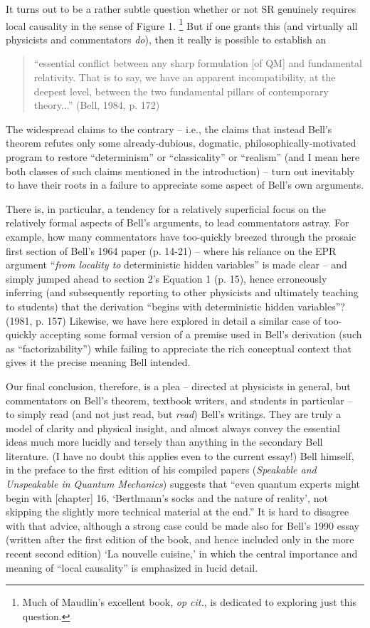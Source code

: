 \documentclass[aps,prc,twocolumn]{revtex4}
\begin{document}
It turns out to be a rather subtle question whether or not SR
genuinely requires local causality in the sense of Figure 1.  
\footnote{Much of Maudlin's excellent book, \emph{op cit.}, is
  dedicated to exploring just this question.}
But if one grants this (and virtually all physicists and commentators
\emph{do}), then it really is possible to establish an 
\begin{quote}
``essential
conflict between any sharp formulation [of QM] and fundamental
relativity.  That is to say, we have an apparent incompatibility, at
the deepest level, between the two fundamental pillars of contemporary
theory...'' (Bell, 1984, p. 172)
\end{quote}
The widespread claims to the contrary -- i.e., the claims that instead
Bell's theorem refutes only some already-dubious, dogmatic,
philosophically-motivated program to restore ``determinism'' or
``classicality'' or ``realism'' (and I mean here both classes of such
claims mentioned in the introduction) -- turn out inevitably to have
their roots in a failure to appreciate some aspect of Bell's own
arguments.  

There is, in particular, a tendency for a relatively 
superficial focus on the relatively formal aspects of Bell's
arguments, to lead commentators astray.  For example, how many
commentators have too-quickly breezed through the prosaic first
section of Bell's 1964 paper (p. 14-21) -- where his reliance on the EPR
argument ``\emph{from locality to} deterministic hidden variables''
is made clear -- and simply jumped ahead to section 2's 
Equation 1 (p. 15), hence erroneously inferring (and subsequently
reporting to other physicists and ultimately teaching to students) 
that the derivation ``begins with deterministic hidden variables''?  
(1981, p. 157)  Likewise, we have here explored in detail 
a similar case of too-quickly accepting some formal version of a
premise used in Bell's derivation (such as ``factorizability'') 
while failing to appreciate the rich conceptual context that gives it
the precise meaning Bell intended.  

Our final conclusion, therefore, is a plea -- directed at physicists
in general, but commentators on Bell's theorem, textbook writers, and
students in particular -- to simply read (and not just read, but
\emph{read}) Bell's writings.  They are
truly a model of clarity and physical insight, and almost always
convey the essential ideas much more lucidly and tersely than anything
in the secondary Bell literature.  (I have no doubt this applies even to
the current essay!)  
Bell himself, in the preface to the first edition
of his compiled papers (\emph{Speakable and Unspeakable in Quantum
  Mechanics}) suggests that ``even quantum experts might begin with
[chapter] 16, `Bertlmann's socks and the nature of reality', not
skipping the slightly more technical material at the end.''  It is
hard to disagree with that advice, although a strong case could be
made also for Bell's 1990 essay (written after the first edition of
the book, and hence included only in the more recent second edition)
`La nouvelle cuisine,' in which the central importance and meaning of
``local causality'' is emphasized in lucid detail.  
\end{document}
